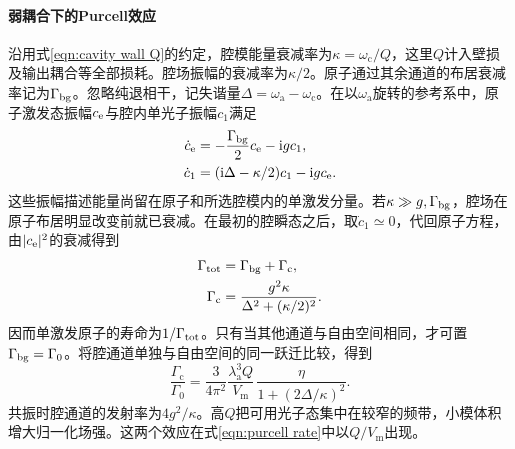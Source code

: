 \paragraph{弱耦合下的Purcell效应}
沿用式\eqref{eqn:cavity wall Q}的约定，腔模能量衰减率为$\kappa = \omega_{\mathrm{c}}/Q$，这里$Q$计入壁损及输出耦合等全部损耗。腔场振幅的衰减率为$\kappa/2$。原子通过其余通道的布居衰减率记为$\Gamma_{\rm bg}$。忽略纯退相干，记失谐量$\Delta = \omega_{\mathrm{a}} - \omega_{\mathrm{c}}$。在以$\omega_{\mathrm{a}}$旋转的参考系中，原子激发态振幅$c_{\mathrm{e}}$与腔内单光子振幅$c_1$满足
\begin{subequations}\label{eqn:atom cavity amplitudes}
    \begin{align}
        \dot c_{\mathrm{e}} &= -\frac{\Gamma_{\rm bg}}{2}c_{\mathrm{e}} - \mathrm{i} g c_1,\\
        \dot c_1 &= (\mathrm{i}\Delta - \kappa/2)c_1 - \mathrm{i} g c_{\mathrm{e}}.
    \end{align}
\end{subequations}
这些振幅描述能量尚留在原子和所选腔模内的单激发分量。若$\kappa \gg g,\Gamma_{\rm bg}$，腔场在原子布居明显改变前就已衰减。在最初的腔瞬态之后，取$\dot c_1 \simeq 0$，代回原子方程，由$\lvert c_{\mathrm{e}}\rvert^2$的衰减得到
\begin{subequations}
    \label{eq:ed-cavity-enhanced-decay}
    \begin{align}
        \Gamma_{\mathrm{tot}} &= \Gamma_{\rm bg} + \Gamma_{\mathrm{c}},\\
        \Gamma_{\mathrm{c}} &= \frac{g^2\kappa}{\Delta^2 + (\kappa/2)^2}.
    \end{align}
\end{subequations}
因而单激发原子的寿命为$1/\Gamma_{\mathrm{tot}}$。只有当其他通道与自由空间相同，才可置$\Gamma_{\rm bg} = \Gamma_0$。将腔通道单独与自由空间的同一跃迁比较，得到
\begin{equation}
    \frac{\Gamma_{\mathrm{c}}}{\Gamma_0}
       = \frac{3}{4\pi^2}\frac{\lambda_{\mathrm{a}}^3 Q}{V_{\mathrm m}}\,
        \frac{\eta}{1 + (2\Delta/\kappa)^2}.
    \label{eqn:purcell rate}
\end{equation}
共振时腔通道的发射率为$4g^2/\kappa$。高$Q$把可用光子态集中在较窄的频带，小模体积增大归一化场强。这两个效应在式\eqref{eqn:purcell rate}中以$Q/V_{\mathrm m}$出现。

